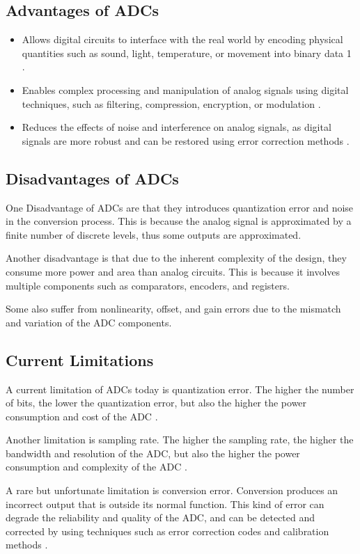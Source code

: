 \documentclass[conference]{IEEEtran}
\begin{document}
\subsection{Advantages of ADCs}
\begin{itemize}
    \item Allows digital circuits to interface with the real world by encoding physical quantities such as sound, light, temperature, or movement into binary data 1 \cite{b3}.
    \item Enables complex processing and manipulation of analog signals using digital techniques, such as filtering, compression, encryption, or modulation \cite{b4}.
    \item Reduces the effects of noise and interference on analog signals, as digital signals are more robust and can be restored using error correction methods \cite{b5}.
\end{itemize}

\subsection{Disadvantages of ADCs}

One Disadvantage of ADCs are that they introduces quantization error and noise in the conversion process. This is because the analog signal is approximated by a finite number of discrete levels, thus some outputs are approximated. \par
Another disadvantage is that due to the inherent complexity of the design, they consume more power and area than analog circuits. This is because it involves multiple components such as comparators, encoders, and registers. \par
Some also suffer from nonlinearity, offset, and gain errors due to the mismatch and variation of the ADC components.

\subsection{Current Limitations}

A current limitation of ADCs today is quantization error. The higher the number of bits, the lower the quantization error, but also the higher the power consumption and cost of the ADC \cite{b6}. \par
Another limitation is sampling rate. The higher the sampling rate, the higher the bandwidth and resolution of the ADC, but also the higher the power consumption and complexity of the ADC \cite{b3}. \par
A rare but unfortunate limitation is conversion error. Conversion produces an incorrect output that is outside its normal function. This kind of error can degrade the reliability and quality of the ADC, and can be detected and corrected by using techniques such as error correction codes and calibration methods \cite{b7}.
\end{document}
